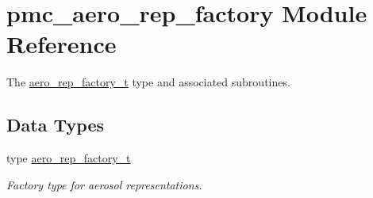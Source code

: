 \hypertarget{namespacepmc__aero__rep__factory}{}\section{pmc\+\_\+aero\+\_\+rep\+\_\+factory Module Reference}
\label{namespacepmc__aero__rep__factory}


The \mbox{\hyperlink{structpmc__aero__rep__factory_1_1aero__rep__factory__t}{aero\+\_\+rep\+\_\+factory\+\_\+t}} type and associated subroutines.  


\subsection*{Data Types}
\begin{DoxyCompactItemize}
\item 
type \mbox{\hyperlink{structpmc__aero__rep__factory_1_1aero__rep__factory__t}{aero\+\_\+rep\+\_\+factory\+\_\+t}}
\begin{DoxyCompactList}\small\item\em Factory type for aerosol representations. \end{DoxyCompactList}\end{DoxyCompactItemize}
